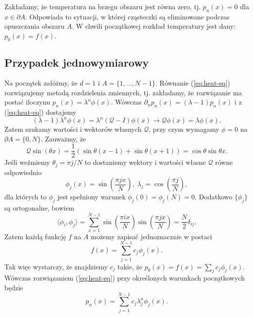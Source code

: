 Zakładamy, że temperatura na brzegu obszaru jest równa zero, tj. $p_n(x) = 0$ dla $x \in \partial A$.
Odpowiada to sytuacji, w której cząsteczki są eliminowane podczas opuszczania obszaru $A$.
W chwili początkowej rozkład temperatury jest dany: $p_0(x) = f(x)$.

\subsection{Przypadek jednowymiarowy}
Na początek załóżmy, że $d=1$ i $A = \{1, \dots, N-1\}$.
Równanie (\ref{eq:heat-eq}) rozwiązujemy metodą rozdzielenia zmiennych, tj. zakładamy, że rozwiązanie ma postać iloczynu $p_n(x) = \lambda^n \phi(x)$.
Wówczas $\partial_n p_n(x) = (\lambda - 1)p_n(x)$ i z (\ref{eq:heat-eq}) dostajemy
\begin{equation*}
    (\lambda - 1)\lambda^n \phi(x) = \lambda^n (\mathcal{Q} - I) \phi(x) \rightarrow \mathcal{Q}\phi(x) = \lambda \phi(x).
\end{equation*}
Zatem szukamy wartości i wektorów własnych $\mathcal{Q}$, przy czym wymagamy $\phi = 0$ na $\partial A = \{0, N\}$.
Zauważmy, że 
\begin{equation*}
    \mathcal{Q} \sin(\theta x)
    = \frac{1}{2} ( \sin\theta(x-1) + \sin\theta(x+1))
    = \cos\theta \sin\theta x.
\end{equation*}
Jeśli weźmiemy $\theta_j = \pi j/N$ to dostaniemy wektory i wartości własne $\mathcal{Q}$ równe odpowiednio
\begin{equation*}
    \phi_j(x) = \sin\left( \frac{\pi j x}{N} \right), \; \lambda_j = \cos\left( \frac{\pi j}{N} \right),
\end{equation*}
dla których to $\phi_j$ jest spełniony warunek $\phi_j(0) = \phi_j(N) = 0$.
Dodatkowo $\{\phi_j\}$ są ortogonalne, bowiem
\begin{equation*}
    \langle \phi_i, \phi_j \rangle = \sum_{x=1}^{N-1} \sin\left( \frac{\pi i x}{N} \right) \sin\left( \frac{\pi j x}{N} \right)
    = \frac{N}{2} \delta_{ij}.
\end{equation*}
Zatem każdą funkcję $f$ na $A$ możemy zapisać jednoznacznie w postaci
\begin{equation*}
    f(x) = \sum_{j=1}^{N-1} c_j \phi_j(x).
\end{equation*}
Tak więc wystarczy, że znajdziemy $c_j$ takie, że $p_0(x) = f(x) = \sum_j c_j \phi_j(x)$.
Wówczas rozwiązaniem (\ref{eq:heat-eq}) przy określonych warunkach początkowych będzie
\begin{equation*}
    p_n(x) = \sum_{j=1}^{N-1}c_j \lambda_j^n \phi_j(x).
\end{equation*}

